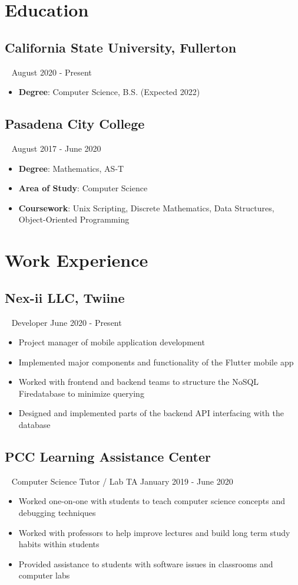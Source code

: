 \documentclass{article}
\newcommand{\resumesection}[3]{
    \subsection*{#1}
    \ 
    \footnotesize
    \textcolor{csufgrey}{#2}
    \footnotesize
    \hfill
    \textcolor{csufgrey}{#3}
    \normalsize
}
\begin{document}
\pagestyle{useheader}

\section*{Education}
\resumesection{California State University, Fullerton}{}{August 2020 - Present}
\begin{itemize}
    \item \textbf{Degree}: Computer Science, B.S. (Expected 2022)
\end{itemize}
\resumesection{Pasadena City College}{}{August 2017 - June 2020}
\begin{itemize}
    \item \textbf{Degree}: Mathematics, AS-T
    \item \textbf{Area of Study}: Computer Science
    \item \textbf{Coursework}: Unix Scripting, Discrete Mathematics, Data Structures, Object-Oriented Programming
\end{itemize}
\hfill
\section*{Work Experience}
\resumesection{Nex-ii LLC, Twiine}{Developer}{June 2020 - Present}
\begin{itemize}
    \item Project manager of mobile application development
    \item Implemented major components and functionality of the Flutter mobile app
    \item Worked with frontend and backend teams to structure the NoSQL Firedatabase to minimize querying
    \item Designed and implemented parts of the backend API interfacing with the database
\end{itemize}
\resumesection{PCC Learning Assistance Center}{Computer Science Tutor / Lab TA}{January 2019 - June 2020}
\begin{itemize}
    \item Worked one-on-one with students to teach computer science concepts and debugging techniques
    \item Worked with professors to help improve lectures and build long term study habits within students
    \item Provided assistance to students with software issues in classrooms and computer labs
\end{itemize}
\hfill
\end{document}
